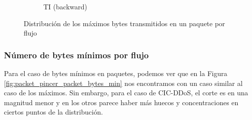 \begin{figure}[H]
\begin{subfigure}[b]{0.26\textwidth}
        \caption{TI (backward)}
    \end{subfigure}
    \hfill
       \caption{Distribución de los máximos bytes transmitidos en un paquete por flujo}
       \label{fig:packet_pincer_packet_bytes_max}
\end{figure}

\subsubsection{Número de bytes mínimos por flujo}

Para el caso de bytes mínimos en paquetes, podemos ver que en la Figura \ref{fig:packet_pincer_packet_bytes_min} nos encontramos con un caso similar al caso de los máximos. Sin embargo, para el caso de CIC-DDoS, el corte es en una magnitud menor y en los otros parece haber más huecos y concentraciones en ciertos puntos de la distribución.

